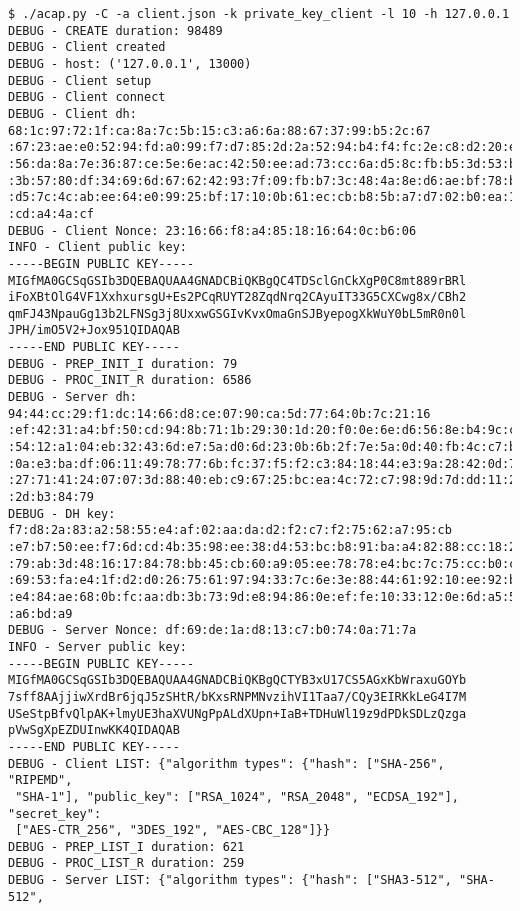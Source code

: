 \begin{subappendices}
\begin{small}
\begin{verbatim}
$ ./acap.py -C -a client.json -k private_key_client -l 10 -h 127.0.0.1
DEBUG - CREATE duration: 98489
DEBUG - Client created
DEBUG - host: ('127.0.0.1', 13000)
DEBUG - Client setup
DEBUG - Client connect
DEBUG - Client dh: 68:1c:97:72:1f:ca:8a:7c:5b:15:c3:a6:6a:88:67:37:99:b5:2c:67
:67:23:ae:e0:52:94:fd:a0:99:f7:d7:85:2d:2a:52:94:b4:f4:fc:2e:c8:d2:20:ec:9b:0a
:56:da:8a:7e:36:87:ce:5e:6e:ac:42:50:ee:ad:73:cc:6a:d5:8c:fb:b5:3d:53:bb:32:21
:3b:57:80:df:34:69:6d:67:62:42:93:7f:09:fb:b7:3c:48:4a:8e:d6:ae:bf:78:b6:ca:2b
:d5:7c:4c:ab:ee:64:e0:99:25:bf:17:10:0b:61:ec:cb:b8:5b:a7:d7:02:b0:ea:1e:03:8a
:cd:a4:4a:cf
DEBUG - Client Nonce: 23:16:66:f8:a4:85:18:16:64:0c:b6:06
INFO - Client public key:
-----BEGIN PUBLIC KEY-----
MIGfMA0GCSqGSIb3DQEBAQUAA4GNADCBiQKBgQC4TDSclGnCkXgP0C8mt889rBRl
iFoXBtOlG4VF1XxhxursgU+Es2PCqRUYT28ZqdNrq2CAyuIT33G5CXCwg8x/CBh2
qmFJ43NpauGg13b2LFNSg3j8UxxwGSGIvKvxOmaGnSJByepogXkWuY0bL5mR0n0l
JPH/imO5V2+Jox951QIDAQAB
-----END PUBLIC KEY-----
DEBUG - PREP_INIT_I duration: 79
DEBUG - PROC_INIT_R duration: 6586
DEBUG - Server dh: 94:44:cc:29:f1:dc:14:66:d8:ce:07:90:ca:5d:77:64:0b:7c:21:16
:ef:42:31:a4:bf:50:cd:94:8b:71:1b:29:30:1d:20:f0:0e:6e:d6:56:8e:b4:9c:cd:58:5f
:54:12:a1:04:eb:32:43:6d:e7:5a:d0:6d:23:0b:6b:2f:7e:5a:0d:40:fb:4c:c7:bd:ee:b7
:0a:e3:ba:df:06:11:49:78:77:6b:fc:37:f5:f2:c3:84:18:44:e3:9a:28:42:0d:76:ea:59
:27:71:41:24:07:07:3d:88:40:eb:c9:67:25:bc:ea:4c:72:c7:98:9d:7d:dd:11:25:50:b5
:2d:b3:84:79
DEBUG - DH key: f7:d8:2a:83:a2:58:55:e4:af:02:aa:da:d2:f2:c7:f2:75:62:a7:95:cb
:e7:b7:50:ee:f7:6d:cd:4b:35:98:ee:38:d4:53:bc:b8:91:ba:a4:82:88:cc:18:2d:55:fd
:79:ab:3d:48:16:17:84:78:bb:45:cb:60:a9:05:ee:78:78:e4:bc:7c:75:cc:b0:c0:a2:7e
:69:53:fa:e4:1f:d2:d0:26:75:61:97:94:33:7c:6e:3e:88:44:61:92:10:ee:92:bc:71:ab
:e4:84:ae:68:0b:fc:aa:db:3b:73:9d:e8:94:86:0e:ef:fe:10:33:12:0e:6d:a5:59:ac:78
:a6:bd:a9
DEBUG - Server Nonce: df:69:de:1a:d8:13:c7:b0:74:0a:71:7a
INFO - Server public key:
-----BEGIN PUBLIC KEY-----
MIGfMA0GCSqGSIb3DQEBAQUAA4GNADCBiQKBgQCTYB3xU17CS5AGxKbWraxuGOYb
7sff8AAjjiwXrdBr6jqJ5zSHtR/bKxsRNPMNvzihVI1Taa7/CQy3EIRKkLeG4I7M
USeStpBfvQlpAK+lmyUE3haXVUNgPpALdXUpn+IaB+TDHuWl19z9dPDkSDLzQzga
pVwSgXpEZDUInwKK4QIDAQAB
-----END PUBLIC KEY-----
DEBUG - Client LIST: {"algorithm types": {"hash": ["SHA-256", "RIPEMD",
 "SHA-1"], "public_key": ["RSA_1024", "RSA_2048", "ECDSA_192"], "secret_key":
 ["AES-CTR_256", "3DES_192", "AES-CBC_128"]}}
DEBUG - PREP_LIST_I duration: 621
DEBUG - PROC_LIST_R duration: 259
DEBUG - Server LIST: {"algorithm types": {"hash": ["SHA3-512", "SHA-512",

\end{verbatim}
\end{small}
\end{subappendices}
